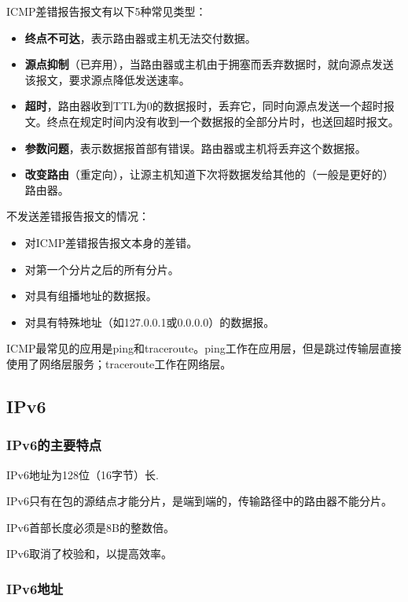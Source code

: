\documentclass[12pt, a4paper, oneside]{ctexart}
\begin{document}
\begin{enumerate}
    ICMP差错报告报文有以下5种常见类型：
    \begin{itemize}
        \item {\bf 终点不可达}，表示路由器或主机无法交付数据。
        \item {\bf 源点抑制}（已弃用），当路由器或主机由于拥塞而丢弃数据时，就向源点发送该报文，要求源点降低发送速率。
        \item {\bf 超时}，路由器收到TTL为0的数据报时，丢弃它，同时向源点发送一个超时报文。终点在规定时间内没有收到一个数据报的全部分片时，也送回超时报文。
        \item {\bf 参数问题}，表示数据报首部有错误。路由器或主机将丢弃这个数据报。
        \item {\bf 改变路由}（重定向），让源主机知道下次将数据发给其他的（一般是更好的）路由器。
    \end{itemize}

    不发送差错报告报文的情况：
    \begin{itemize}
        \item 对ICMP差错报告报文本身的差错。
        \item 对第一个分片之后的所有分片。
        \item 对具有组播地址的数据报。
        \item 对具有特殊地址（如127.0.0.1或0.0.0.0）的数据报。
    \end{itemize}

    ICMP最常见的应用是ping和traceroute。ping工作在应用层，但是跳过传输层直接使用了网络层服务；traceroute工作在网络层。
\end{enumerate}

\subsection{IPv6}

\subsubsection{IPv6的主要特点}

IPv6地址为128位（16字节）长.

IPv6只有在包的源结点才能分片，是端到端的，传输路径中的路由器不能分片。

IPv6首部长度必须是8B的整数倍。

IPv6取消了校验和，以提高效率。

\subsubsection{IPv6地址}
\end{document}
